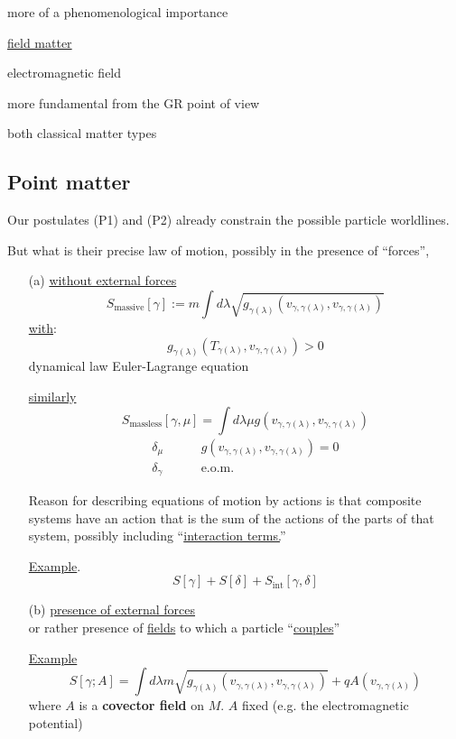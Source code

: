 \documentclass[10pt, twoside]{amsart}
\begin{document}
\begin{multicols*}{2}
more of a phenomenological importance

\underline{field matter}
 
electromagnetic field

more fundamental from the GR point of view


both classical matter types


\subsection{Point matter}

Our postulates (P1) and (P2) already constrain the possible particle worldlines.  

But what is their precise law of motion, possibly in the presence of ``forces'',

\begin{enumerate}
\item[(a)] \underline{without external forces}
\[
S_{\text{massive}}[\gamma] := m \int d\lambda \sqrt{ g_{\gamma(\lambda)}( v_{\gamma,\gamma(\lambda)} , v_{\gamma,\gamma(\lambda) } ) }
\]
\underline{with}:
\[
g_{\gamma(\lambda)}(T_{\gamma(\lambda)}, v_{\gamma, \gamma(\lambda) } ) > 0 
\]
dynamical law Euler-Lagrange equation

\underline{similarly}
\[
S_{\text{massless}}[\gamma,\mu] = \int d\lambda \mu g(v_{\gamma, \gamma(\lambda)} , v_{\gamma,\gamma(\lambda)} )
\]
\[
\begin{aligned}
  \delta_{\mu}  \quad \quad \, & g(v_{\gamma,\gamma(\lambda)}, v_{\gamma,\gamma(\lambda) } ) = 0 \\
 \delta_{\gamma} \quad \quad \, & \text{e.o.m.}
\end{aligned}
\]

Reason for describing equations of motion by actions is that composite systems have an action that is the sum of the actions of the parts of that system, possibly including ``\underline{interaction terms.}''

\underline{Example}. \[
S[\gamma] + S[\delta] + S_{\text{int}}[\gamma,\delta]
\]
\item[(b)] \underline{presence of external forces} \\
or rather presence of \underline{fields} to which a particle ``\underline{couples}''

\underline{Example}
\[
S[\gamma;A] = \int d\lambda m \sqrt{ g_{\gamma(\lambda)}(v_{\gamma, \gamma(\lambda)}, v_{\gamma,\gamma(\lambda)} ) } + qA(v_{\gamma,\gamma(\lambda)})
\]
where $A$ is a \textbf{covector field} on $M$. $A$ fixed
(e.g. the electromagnetic potential)
\end{enumerate}


\end{multicols*}
\end{document}
